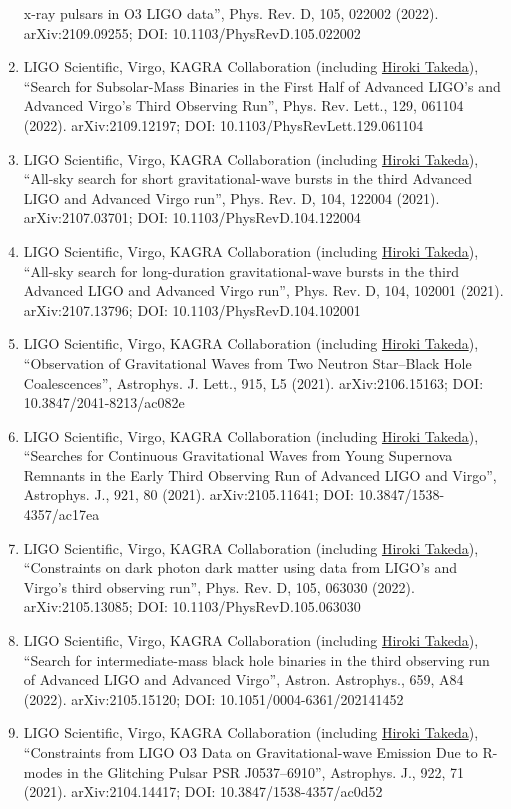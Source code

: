 \documentclass[uplatex, 11pt]{jsarticle}
\begin{document}
\begin{enumerate}
x-ray pulsars in O3 LIGO data”, Phys. Rev. D, 105, 022002 (2022). arXiv:2109.09255; DOI: 10.1103/PhysRevD.105.022002
\item LIGO Scientific, Virgo, KAGRA Collaboration (including \uline{Hiroki Takeda}), “Search for Subsolar-Mass Binaries in the First Half of Advanced LIGO's and Advanced Virgo's Third Observing Run”, Phys. Rev. Lett., 129, 061104 (2022). arXiv:2109.12197; DOI: 10.1103/PhysRevLett.129.061104
\item LIGO Scientific, Virgo, KAGRA Collaboration (including \uline{Hiroki Takeda}), “All-sky search for short gravitational-wave bursts in the third Advanced LIGO and Advanced Virgo run”, Phys. Rev. D, 104, 122004 (2021). arXiv:2107.03701; DOI: 10.1103/PhysRevD.104.122004
\item LIGO Scientific, Virgo, KAGRA Collaboration (including \uline{Hiroki Takeda}), “All-sky search for long-duration gravitational-wave bursts in the third Advanced LIGO and Advanced Virgo run”, Phys. Rev. D, 104, 102001 (2021). arXiv:2107.13796; DOI: 10.1103/PhysRevD.104.102001
\item LIGO Scientific, Virgo, KAGRA Collaboration (including \uline{Hiroki Takeda}), “Observation of Gravitational Waves from Two Neutron Star–Black Hole Coalescences”, Astrophys. J. Lett., 915, L5 (2021). arXiv:2106.15163; DOI: 10.3847/2041-8213/ac082e
\item LIGO Scientific, Virgo, KAGRA Collaboration (including \uline{Hiroki Takeda}), “Searches for Continuous Gravitational Waves from Young Supernova Remnants in the Early Third Observing Run of Advanced LIGO and Virgo”, Astrophys. J., 921, 80 (2021). arXiv:2105.11641; DOI: 10.3847/1538-4357/ac17ea
\item LIGO Scientific, Virgo, KAGRA Collaboration (including \uline{Hiroki Takeda}), “Constraints on dark photon dark matter using data from LIGO's and Virgo's third observing run”, Phys. Rev. D, 105, 063030 (2022). arXiv:2105.13085; DOI: 10.1103/PhysRevD.105.063030
\item LIGO Scientific, Virgo, KAGRA Collaboration (including \uline{Hiroki Takeda}), “Search for intermediate-mass black hole binaries in the third observing run of Advanced LIGO and Advanced Virgo”, Astron. Astrophys., 659, A84 (2022). arXiv:2105.15120; DOI: 10.1051/0004-6361/202141452
\item LIGO Scientific, Virgo, KAGRA Collaboration (including \uline{Hiroki Takeda}), “Constraints from LIGO O3 Data on Gravitational-wave Emission Due to R-modes in the Glitching Pulsar PSR J0537–6910”, Astrophys. J., 922, 71 (2021). arXiv:2104.14417; DOI: 10.3847/1538-4357/ac0d52

\end{enumerate}
\end{document}

